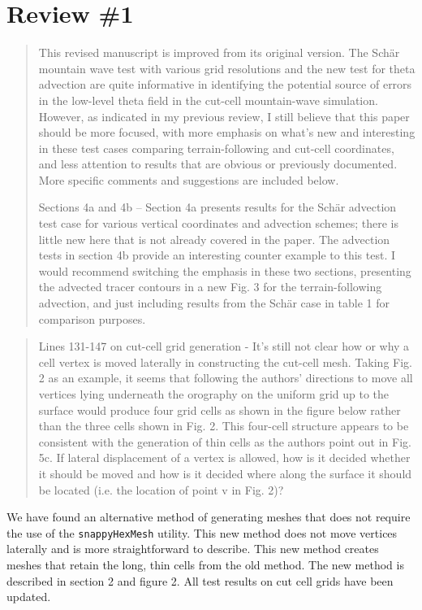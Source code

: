 \documentclass{article}
\begin{document}
\section*{Review \#1}
\begin{quotation}
This revised manuscript is improved from its original version. The Sch\"{a}r mountain wave test with various grid resolutions and the new test for theta advection are quite informative in identifying the potential source of errors in the low-level theta field in the cut-cell mountain-wave simulation. However, as indicated in my previous review, I still believe that this paper should be more focused, with more emphasis on what's new and interesting in these test cases comparing terrain-following and cut-cell coordinates, and less attention to results that are obvious or previously documented. More specific comments and suggestions are included below. 

Sections 4a and 4b – Section 4a presents results for the Sch\"{a}r advection test case for various vertical coordinates and advection schemes; there is little new here that is not already covered in the \citet{schaer2002} paper. The advection tests in section 4b provide an interesting counter example to this test. I would recommend switching the emphasis in these two sections, presenting the advected tracer contours in a new Fig. 3 for the terrain-following advection, and just including results from the Sch\"{a}r case in table 1 for comparison purposes.
\end{quotation}
\begin{quotation}
 Lines 131-147 on cut-cell grid generation - It's still not clear how or why a cell vertex  is moved laterally in constructing the cut-cell mesh. Taking Fig. 2 as an example, it  seems that following the authors' directions to move all vertices lying underneath the  orography on the uniform grid up to the surface would produce four grid cells as  shown in the figure below rather than the three cells shown in Fig. 2. This four-cell structure appears to be consistent with the generation of thin cells as the authors  point out in Fig. 5c. If lateral displacement of a vertex is allowed, how is it decided  whether it should be moved and how is it decided where along the surface it should  be located (i.e. the location of point v in Fig. 2)?
\end{quotation}
We have found an alternative method of generating meshes that does not require the use of the \texttt{snappyHexMesh} utility.  This new method does not move vertices laterally and is more straightforward to describe.  This new method creates meshes that retain the long, thin cells from the old method.  The new method is described in section 2 and figure 2.  All test results on cut cell grids have been updated.
\end{document}
